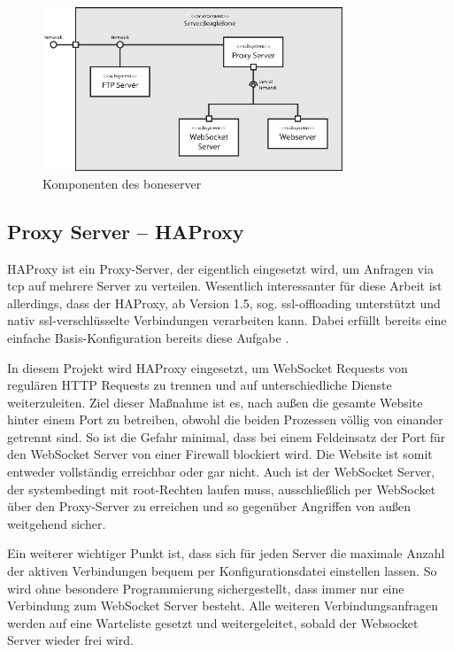 \begin{figure}[ht]
  \centering
  \includegraphics[width = 0.8\textwidth]{dokumentation/images/componentsServer.eps}
  \caption{Komponenten des boneserver}
  \label{fig:componentsServer}
\end{figure}


\subsection{Proxy Server -- HAProxy}
\label{subsec:HAProxy}
HAProxy ist ein Proxy-Server, der eigentlich eingesetzt wird, um Anfragen via \gls{tcp} auf mehrere Server zu verteilen. Wesentlich interessanter für diese Arbeit ist allerdings, dass der HAProxy, ab Version 1.5, sog. \gls{ssl-offloading} unterstützt und nativ \gls{ssl}-verschlüsselte Verbindungen verarbeiten kann. Dabei erfüllt bereits eine einfache Basis-Konfiguration bereits diese Aufgabe \cite{kuehnast2014}.

In diesem Projekt wird HAProxy eingesetzt, um WebSocket Requests von regulären HTTP Requests zu trennen und auf unterschiedliche Dienste weiterzuleiten. Ziel dieser Maßnahme ist es, nach außen die gesamte Website hinter einem Port zu betreiben, obwohl die beiden Prozessen völlig von einander getrennt sind. So ist die Gefahr minimal, dass bei einem Feldeinsatz der Port für den WebSocket Server von einer Firewall blockiert wird. Die Website ist somit entweder vollständig erreichbar oder gar nicht. Auch ist der WebSocket Server, der systembedingt mit root-Rechten laufen muss, ausschließlich per WebSocket über den Proxy-Server zu erreichen und so gegenüber Angriffen von außen weitgehend sicher.

Ein weiterer wichtiger Punkt ist, dass sich für jeden Server die maximale Anzahl der aktiven Verbindungen bequem per Konfigurationsdatei einstellen lassen. So wird ohne besondere Programmierung sichergestellt, dass immer nur eine Verbindung zum WebSocket Server besteht. Alle weiteren Verbindungsanfragen werden auf eine Warteliste gesetzt und weitergeleitet, sobald der Websocket Server wieder frei wird.\\


